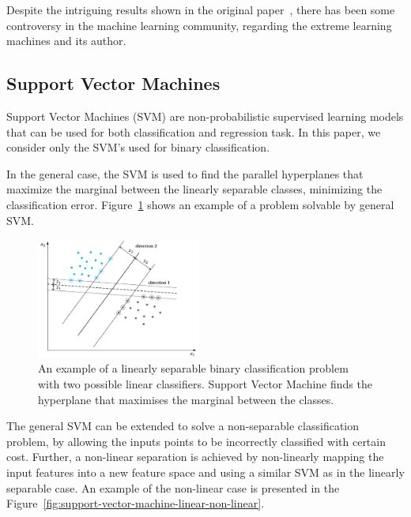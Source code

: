 Despite the intriguing results shown in the original paper~\cite{huang:2006:elm}, there has been some controversy in the machine learning community, regarding the extreme learning machines and its author.~\cite{reddit:2015:elm-controversy}

\subsection{Support Vector Machines}
Support Vector Machines (SVM) are non-probabilistic supervised learning models that can be used for both classification and regression task. In this paper, we consider only the SVM's used for binary classification.

In the general case, the SVM is used to find the parallel hyperplanes that maximize the marginal between the linearly separable classes, minimizing the classification error. Figure~\ref{fig:support-vector-machine-linear} shows an example of a problem solvable by general SVM.~\cite{theodoridis:2009:pattern-recognition}

\begin{figure}[H]
\centering
\includegraphics[width=0.48\textwidth]{images/support-vector-machine-linear.pdf}
\caption{An example of a linearly separable binary classification problem with two possible linear classifiers. Support Vector Machine finds the hyperplane that maximises the marginal between the classes.~\cite{theodoridis:2009:pattern-recognition}}
\label{fig:support-vector-machine-linear}
\end{figure}

The general SVM can be extended to solve a non-separable classification problem, by allowing the inputs points to be incorrectly classified with certain cost. Further, a non-linear separation is achieved by non-linearly mapping the input features into a new feature space and using a similar SVM as in the linearly separable case. An example of the non-linear case is presented in the Figure~\ref{fig:support-vector-machine-linear-non-linear}.~\cite{theodoridis:2009:pattern-recognition}

